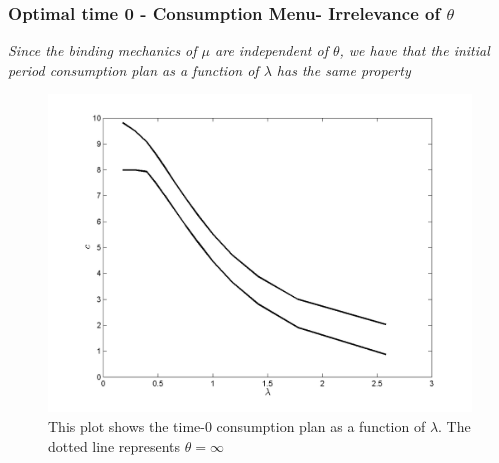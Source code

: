 \documentclass{beamer}
\begin{document}
\begin{frame}
\frametitle{Optimal time 0 - Consumption Menu- Irrelevance of $\theta$}
\emph{Since the binding mechanics of $\mu$ are independent of $\theta$, we have that the initial period consumption plan as a function of $\lambda$ has the same property }

\begin{figure}[htbp]
\centering
	  \includegraphics[scale=0.4]{Matlab/PrivateInformation/Plots/CompOptContractCons.png}

	\caption{This plot shows the time-0 consumption plan as a function of $\lambda$. The dotted line represents $\theta=\infty$}
	\label{fig:CompOptContractCons}
\end{figure} 
\end{frame}
\end{document}
